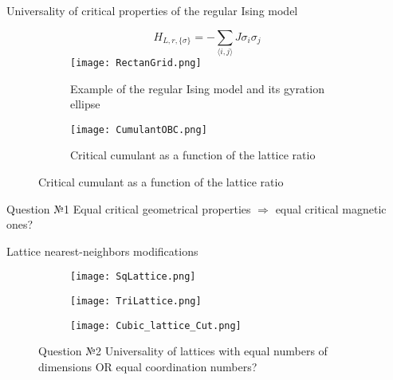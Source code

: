 \documentclass{beamer}
\begin{document}
\begin{frame}{Universality of critical properties of the regular Ising model}

\begin{figure}
\centering
\begin{subfigure}{0.45\textwidth}
\begin{equation}\label{H_Ising_Rectan}
  H_{L, r, \{\sigma\}} = - \sum_{\langle i,j \rangle} J  \sigma_{i}  \sigma_{j}
\end{equation}
\texttt{[image: RectanGrid.png]}
\caption{Example of the regular Ising model and its gyration ellipse}
\end{subfigure}
\hfill
\begin{subfigure}{0.45\textwidth}
\texttt{[image: CumulantOBC.png]}
\caption{Critical cumulant as a function of the lattice ratio \cite{Selke2006}}
\end{subfigure}
\end{figure}



\begin{alertblock}{Question №1}
Equal critical geometrical properties $\Rightarrow$ equal critical magnetic ones?
\end{alertblock}
\end{frame}

\begin{frame}{Lattice nearest-neighbors modifications}

\begin{figure}[t]
\centering
\begin{subfigure}{0.34\textwidth}
\centering
\texttt{[image: SqLattice.png]}
\end{subfigure}
\hfill
\begin{subfigure}{0.34\textwidth}
\centering
\texttt{[image: TriLattice.png]}
\end{subfigure}
\hfill
\begin{subfigure}{0.3\textwidth}
\centering
\texttt{[image: Cubic\_lattice\_Cut.png]}
\end{subfigure}

\begin{alertblock}{Question №2}
Universality of lattices with equal numbers of dimensions OR equal coordination numbers? 
\end{alertblock}
\end{figure}

\end{frame}
\end{document}
